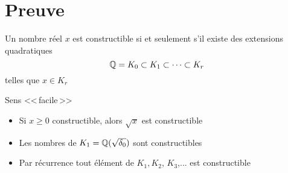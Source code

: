 \begin{frame}  


\begin{minipage}{0.63\textwidth}
\begin{itemize}
  \setlength{\itemsep}{7pt}
\end{itemize}
 
\end{minipage}
\begin{minipage}{0.34\textwidth}
\end{minipage}
\end{frame}



\section{Preuve}


\begin{frame}

\begin{theoreme}[de Wantzel]
\label{th:wantzel}
Un nombre réel $x$ est constructible si et seulement s'il existe 
des extensions quadratiques 
$$\mathbb{Q} = K_0 \subset K_1 \subset \cdots \subset K_r$$
telles que $x \in K_r$
\end{theoreme}

\pause
\bigskip

Sens <<\,facile\,>>
\pause
\begin{itemize}
  \item Si $x\ge 0$ constructible, alors $\sqrt{x}$ est constructible
  \pause
  \item Les nombres de $K_1 = \mathbb{Q}(\sqrt{\delta_0})$ sont constructibles
  \pause
  \item Par récurrence tout élément de $K_1,K_2$, $K_3$,... est constructible
\end{itemize}

\end{frame}


